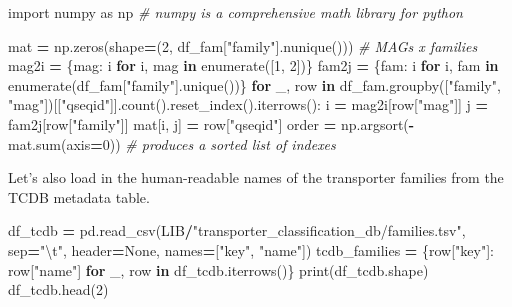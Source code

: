 \documentclass[
]{book}
\newenvironment{Shaded}{\begin{snugshade}}{\end{snugshade}}
\newcommand{\BuiltInTok}[1]{#1}
\newcommand{\CharTok}[1]{\textcolor[rgb]{0.31,0.60,0.02}{#1}}
\newcommand{\CommentTok}[1]{\textcolor[rgb]{0.56,0.35,0.01}{\textit{#1}}}
\newcommand{\ControlFlowTok}[1]{\textcolor[rgb]{0.13,0.29,0.53}{\textbf{#1}}}
\newcommand{\DecValTok}[1]{\textcolor[rgb]{0.00,0.00,0.81}{#1}}
\newcommand{\ImportTok}[1]{#1}
\newcommand{\KeywordTok}[1]{\textcolor[rgb]{0.13,0.29,0.53}{\textbf{#1}}}
\newcommand{\NormalTok}[1]{#1}
\newcommand{\OperatorTok}[1]{\textcolor[rgb]{0.81,0.36,0.00}{\textbf{#1}}}
\newcommand{\StringTok}[1]{\textcolor[rgb]{0.31,0.60,0.02}{#1}}
\newcommand{\VariableTok}[1]{\textcolor[rgb]{0.00,0.00,0.00}{#1}}
\begin{document}
\begin{Shaded}
\begin{Highlighting}[numbers=left,,]
\ImportTok{import}\NormalTok{ numpy }\ImportTok{as}\NormalTok{ np }\CommentTok{\# numpy is a comprehensive math library for python}

\NormalTok{mat }\OperatorTok{=}\NormalTok{ np.zeros(shape}\OperatorTok{=}\NormalTok{(}\DecValTok{2}\NormalTok{, df\_fam[}\StringTok{"family"}\NormalTok{].nunique())) }\CommentTok{\# MAGs x families}
\NormalTok{mag2i }\OperatorTok{=}\NormalTok{ \{mag: i }\ControlFlowTok{for}\NormalTok{ i, mag }\KeywordTok{in} \BuiltInTok{enumerate}\NormalTok{([}\DecValTok{1}\NormalTok{, }\DecValTok{2}\NormalTok{])\}}
\NormalTok{fam2j }\OperatorTok{=}\NormalTok{ \{fam: i }\ControlFlowTok{for}\NormalTok{ i, fam }\KeywordTok{in} \BuiltInTok{enumerate}\NormalTok{(df\_fam[}\StringTok{"family"}\NormalTok{].unique())\}}
\ControlFlowTok{for}\NormalTok{ \_, row }\KeywordTok{in}\NormalTok{ df\_fam.groupby([}\StringTok{"family"}\NormalTok{, }\StringTok{"mag"}\NormalTok{])[[}\StringTok{"qseqid"}\NormalTok{]].count().reset\_index().iterrows():}
\NormalTok{    i }\OperatorTok{=}\NormalTok{ mag2i[row[}\StringTok{"mag"}\NormalTok{]]}
\NormalTok{    j }\OperatorTok{=}\NormalTok{ fam2j[row[}\StringTok{"family"}\NormalTok{]]}
\NormalTok{    mat[i, j] }\OperatorTok{=}\NormalTok{ row[}\StringTok{"qseqid"}\NormalTok{]}
\NormalTok{order }\OperatorTok{=}\NormalTok{ np.argsort(}\OperatorTok{{-}}\NormalTok{mat.}\BuiltInTok{sum}\NormalTok{(axis}\OperatorTok{=}\DecValTok{0}\NormalTok{)) }\CommentTok{\# produces a sorted list of indexes}
\end{Highlighting}
\end{Shaded}

Let's also load in the human-readable names of the transporter families from the TCDB metadata table.

\begin{Shaded}
\begin{Highlighting}[numbers=left,,]
\NormalTok{df\_tcdb }\OperatorTok{=}\NormalTok{ pd.read\_csv(LIB}\OperatorTok{/}\StringTok{"transporter\_classification\_db/families.tsv"}\NormalTok{, sep}\OperatorTok{=}\StringTok{"}\CharTok{\textbackslash{}t}\StringTok{"}\NormalTok{, header}\OperatorTok{=}\VariableTok{None}\NormalTok{, names}\OperatorTok{=}\NormalTok{[}\StringTok{"key"}\NormalTok{, }\StringTok{"name"}\NormalTok{])}
\NormalTok{tcdb\_families }\OperatorTok{=}\NormalTok{ \{row[}\StringTok{"key"}\NormalTok{]: row[}\StringTok{"name"}\NormalTok{] }\ControlFlowTok{for}\NormalTok{ \_, row }\KeywordTok{in}\NormalTok{ df\_tcdb.iterrows()\}}
\BuiltInTok{print}\NormalTok{(df\_tcdb.shape)}
\NormalTok{df\_tcdb.head(}\DecValTok{2}\NormalTok{)}
\end{Highlighting}
\end{Shaded}
\end{document}
